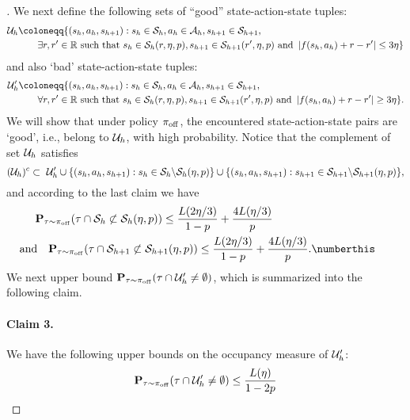 \documentclass{article}
\let\oldparagraph\paragraph
\renewcommand{\paragraph}[1]{\oldparagraph{#1.}}
\begin{document}
\begin{proof}[]
    We next define the following sets of ``good'' state-action-state tuples:
    \begin{align*} 
        \calU_h & \coloneqq \{(s_h, a_h, s_{h+1}): s_h\in \calS_h, a_h\in \calA_h, s_{h+1}\in \calS_{h+1},\\
        & \qquad \exists r, r'\in \RR\text{ such that } s_h\in \calS_h(r, \eta, p), s_{h+1}\in \calS_{h+1}(r', \eta, p)\text{ and }\left|f(s_h, a_h) + r - r'\right|\le 3\eta\}
    \end{align*}
    and also `bad' state-action-state tuples:
    \begin{align*} 
        \calU_h' & \coloneqq \{(s_h, a_h, s_{h+1}): s_h\in \calS_h, a_h\in \calA_h, s_{h+1}\in \calS_{h+1},\\
        & \qquad \forall r, r'\in \RR\text{ such that }s_h\in \calS_h(r, \eta, p), s_{h+1}\in \calS_{h+1}(r', \eta, p)\text{ and }\left|f(s_h, a_h) + r - r'\right|\ge 3\eta\}.
    \end{align*}
    We will show that under policy $\pi_{\mathrm{off}}$, the encountered state-action-state pairs are `good', i.e., belong to $\mathcal{U}_h$, with high probability. Notice that the complement of set $\mathcal{U}_h$ satisfies
    \begin{equation}\label{eq:u-subset}
        (\mathcal{U}_h)^c\subset\ \mathcal{U}_h'\cup \{(s_h, a_h, s_{h+1}): s_h\in \mathcal{S}_h\backslash \mathcal{S}_h(\eta, p)\}\cup \{(s_h, a_h, s_{h+1}): s_{h+1}\in \mathcal{S}_{h+1}\backslash \mathcal{S}_{h+1}(\eta, p)\},
    \end{equation}
    and according to the last claim we have 
    \begin{align*} 
        & \bP_{\tau\sim \pioff}(\tau\cap\calS_h\not\subset \calS_h(\eta, p))\le \frac{L(2\eta/3)}{1-p} + \frac{4L(\eta/3)}{p}\\
        &\hspace{-0.5cm}\text{and}\quad \bP_{\tau\sim \pioff}(\tau\cap\calS_{h+1}\not\subset \calS_{h+1}(\eta, p))\le \frac{L(2\eta/3)}{1-p} + \frac{4L(\eta/3)}{p}. \numberthis \label{eq:s-l}
    \end{align*}
    We next upper bound $\mathbf{P}_{\tau\sim \pi_{\mathrm{off}}}(\tau\cap \mathcal{U}_h'\neq \emptyset)$, which is summarized into the following claim.
    \paragraph{Claim 3} We have the following upper bounds on the occupancy measure of $\mathcal{U}_h'$:
    \begin{equation}\label{eq:u}
        \mathbf{P}_{\tau\sim \pi_{\mathrm{off}}}(\tau\cap \mathcal{U}_h'\neq \emptyset)\le \frac{L(\eta)}{1-2p}
    \end{equation}


\end{proof}
\end{document}
